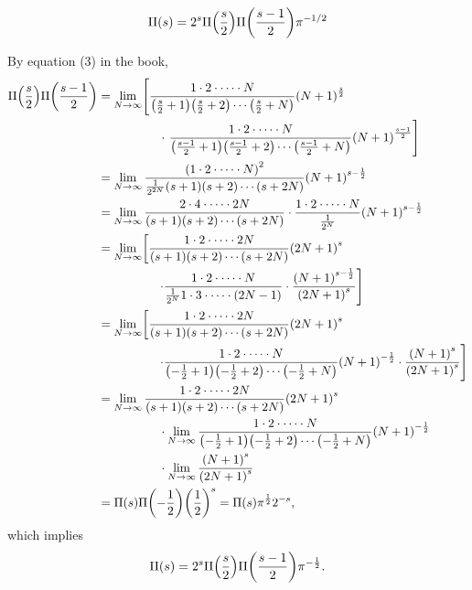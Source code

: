 \documentclass[12pt]{note}
\numberwithin{equation}{chapter}
\newcommand{\piprod}[2]{
  \frac{1\cdot2\cdot\cdots\cdot #2}{\prn{#1+1}\prn{#1+2}\cdots\prn{#1+#2}}
  \prn{#2+1}^{#1}
}
\begin{document}
\begin{quotebox}
  \begin{equation*}
    \Pi(s) = 2^s \Pi \prn{\frac{s}{2}} \Pi \prn{\frac{s - 1}{2}} \pi^{-1/2}
  \end{equation*}
\end{quotebox}

By equation (3) in the book,
\begin{align*}
  \Pi\prn{\frac{s}{2}}\Pi\prn{\frac{s-1}{2}}
   & = \lim_{N\rightarrow\infty} \left[ \piprod{\frac{s}{2}}{N} \right.         \\
   & \hspace{5em} \cdot \left. \piprod{\frac{s-1}{2}}{N} \right]                \\
   & = \lim_{N\rightarrow\infty} \frac{\prn{1\cdot2\cdot\cdots\cdot N}^2}
  {\frac{1}{2^{2N}}\prn{s+1}\prn{s+2}\cdots\prn{s+2N}}\prn{N+1}^{s-\frac12}     \\
   & = \lim_{N\rightarrow\infty} \frac{2\cdot4\cdot\cdots\cdot 2N}{\prn{s+1}
    \prn{s+2}\cdots\prn{s+2N}} \cdot \frac{1\cdot2\cdot\cdots\cdot N}
  {\frac{1}{2^{N}}}\prn{N+1}^{s-\frac12}                                        \\
   & = \lim_{N\rightarrow\infty} \left[ \piprod{s}{2N} \right.                  \\
   & \hspace{5em} \left. \cdot \frac{1\cdot2\cdot\cdots\cdot N}{\frac{1}{2^{N}}
      1\cdot3\cdot\cdots\cdot (2N-1)} \cdot \frac{\prn{N+1}^{s-\frac12}}
  {\prn{2N+1}^s} \right]                                                        \\
   & = \lim_{N\rightarrow\infty} \left[ \piprod{s}{2N} \right.                  \\
   & \hspace{5em} \left. \cdot \piprod{-\frac12}{N} \cdot \frac{\prn{N+1}^{s}}
  {\prn{2N+1}^s} \right]                                                        \\
   & = \lim_{N\rightarrow\infty} \piprod{s}{2N}                                 \\
   & \hspace{5em} \cdot \lim_{N\rightarrow\infty} \piprod{-\frac12}{N}          \\
   & \hspace{5em} \cdot \lim_{N\rightarrow\infty}\frac{\prn{N+1}^{s}}{\prn{2N
  + 1}^s}                                                                       \\
   & = \Pi\prn{s} \Pi\prn{-\frac12} \prn{\frac12}^s = \Pi\prn{s} \pi^{\frac12}
  2^{-s},
\end{align*}
which implies
\begin{equation*}
  \Pi\prn{s} = 2^{s} \Pi\prn{\frac{s}{2}} \Pi\prn{\frac{s-1}{2}} \pi^{-\frac12}.
\end{equation*}
\end{document}
